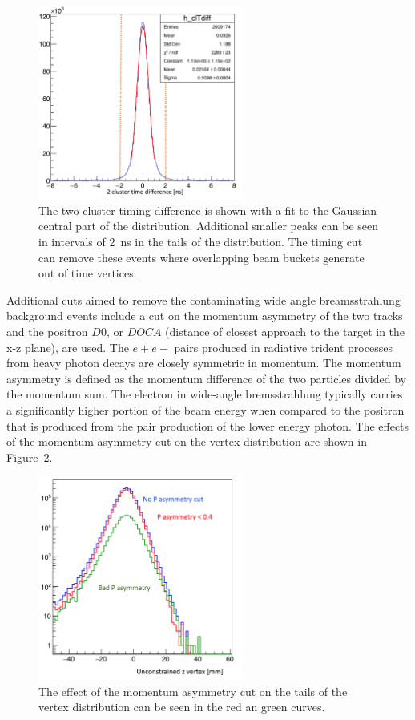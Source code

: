 \begin{figure}[H]
  \centering
      \includegraphics[width=0.6\textwidth]{pics/searching/cltdiff.png}
  \caption{The two cluster timing difference is shown with a fit to the Gaussian central part of the distribution. Additional smaller peaks can be seen in intervals of 2~ns in the tails of the distribution. The timing cut can remove these events where overlapping beam buckets generate out of time vertices.}
  \label{fig:cltdiff}
\end{figure} 

Additional cuts aimed to remove the contaminating wide angle breamsstrahlung background events include a cut on the momentum asymmetry of the two tracks and the positron $D0$, or $DOCA$ (distance of closest approach to the target in the x-z plane), are used. The $e+e-$ pairs produced in radiative trident processes from heavy photon decays are closely symmetric in momentum. The momentum asymmetry is defined as the momentum difference of the two particles divided by the momentum sum. The electron in wide-angle bremsstrahlung typically carries a significantly higher portion of the beam energy when compared to the positron that is produced from the pair production of the lower energy photon. The effects of the momentum asymmetry cut on the vertex distribution are shown in Figure~\ref{fig:pasycut}.

\begin{figure}[H]
  \centering
      \includegraphics[width=0.6\textwidth]{pics/searching/pasycut.png}
  \caption{The effect of the momentum asymmetry cut on the tails of the vertex distribution can be seen in the red an green curves.}
  \label{fig:pasycut}
\end{figure} 

